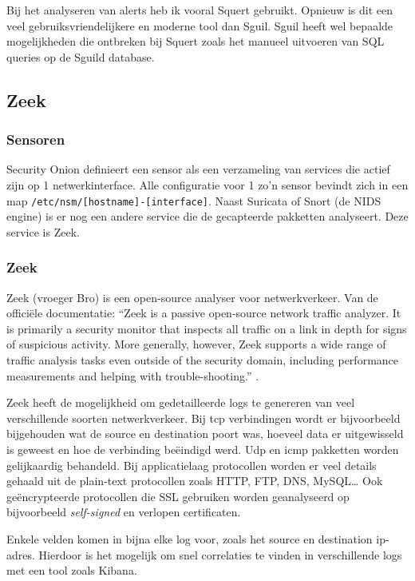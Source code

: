 \documentclass[a4paper,12pt]{report}
\begin{document}
Bij het analyseren van alerts heb ik vooral Squert gebruikt.
Opnieuw is dit een veel gebruiksvriendelijkere en moderne tool dan Sguil.
Sguil heeft wel bepaalde mogelijkheden die ontbreken bij Squert zoals het manueel uitvoeren van SQL queries op de Sguild database.

\subsection{Zeek}
\subsubsection{Sensoren}
Security Onion definieert een sensor als een verzameling van services die actief zijn op 1 netwerkinterface.
Alle configuratie voor 1 zo'n sensor bevindt zich in een map \lstinline|/etc/nsm/[hostname]-[interface]|.
Naast Suricata of Snort (de NIDS engine) is er nog een andere service die de gecapteerde pakketten analyseert.
Deze service is Zeek.

\subsubsection{Zeek}
Zeek (vroeger Bro) is een open-source analyser voor netwerkverkeer.
Van de officiële documentatie:
``Zeek is a passive open-source network traffic analyzer.
It is primarily a security monitor that inspects all traffic on a link in depth for signs of suspicious activity.
More generally, however, Zeek supports a wide range of traffic analysis tasks even outside of the security domain, including performance measurements and helping with trouble-shooting.'' \autocite{zeek:docs}.

Zeek heeft de mogelijkheid om gedetailleerde logs te genereren van veel verschillende soorten netwerkverkeer.
Bij tcp verbindingen wordt er bijvoorbeeld bijgehouden wat de source en destination poort was, hoeveel data er uitgewisseld is geweest en hoe de verbinding beëindigd werd.
Udp en icmp pakketten worden gelijkaardig behandeld.
Bij applicatielaag protocollen worden er veel details gehaald uit de plain-text protocollen zoals HTTP, FTP, DNS, MySQL\dots
Ook geëncrypteerde protocollen die SSL gebruiken worden geanalyseerd op bijvoorbeeld \emph{self-signed} en verlopen certificaten.

Enkele velden komen in bijna elke log voor, zoals het source en destination ip-adres.
Hierdoor is het mogelijk om snel correlaties te vinden in verschillende logs met een tool zoals Kibana.
\end{document}
